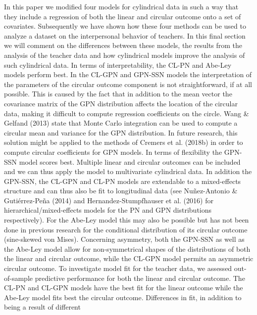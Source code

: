 \documentclass[12pt,]{article}
\begin{document}
In this paper we modified four models for cylindrical data in such a way
that they include a regression of both the linear and circular outcome
onto a set of covariates. Subsequently we have shown how these four
methods can be used to analyze a dataset on the interpersonal behavior
of teachers. In this final section we will comment on the differences
between these models, the results from the analysis of the teacher data
and how cylindrical models improve the analysis of such cylindrical
data.\newline
\indent In terms of interpretability, the CL-PN and Abe-Ley models
perform best. In the CL-GPN and GPN-SSN models the interpretation of the
parameters of the circular outcome component is not straightforward, if
at all possible. This is caused by the fact that in addition to the mean
vector the covariance matrix of the GPN distribution affects the
location of the circular data, making it difficult to compute regression
coefficients on the circle. Wang \& Gelfand (2013) state that Monte
Carlo integration can be used to compute a circular mean and variance
for the GPN distribution. In future research, this solution might be
applied to the methods of Cremers et al. (2018b) in order to compute
circular coefficients for GPN models.\newline
\indent In terms of flexibility the GPN-SSN model scores best. Multiple
linear and circular outcomes can be included and we can thus apply the
model to multivariate cylindrical data. In addition the GPN-SSN, the
CL-GPN and CL-PN models are extendable to a mixed-effects structure and
can thus also be fit to longitudinal data (see Nuñez-Antonio \&
Gutiérrez-Peña (2014) and Hernandez-Stumpfhauser et al. (2016) for
hierarchical/mixed-effects models for the PN and GPN distributions
respectively). For the Abe-Ley model this may also be possible but has
not been done in previous research for the conditional distribution of
its circular outcome (sine-skewed von Mises). Concerning asymmetry, both
the GPN-SSN as well as the Abe-Ley model allow for non-symmetrical
shapes of the distributions of both the linear and circular outcome,
while the CL-GPN model permits an asymmetric circular outcome.\newline
\indent To investigate model fit for the teacher data, we assessed
out-of-sample predictive performance for both the linear and circular
outcome. The CL-PN and CL-GPN models have the best fit for the linear
outcome while the Abe-Ley model fits best the circular outcome.
Differences in fit, in addition to being a result of different
\end{document}
